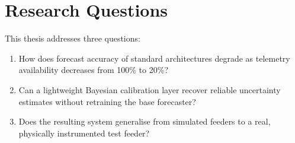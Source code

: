 \section{Research Questions}
This thesis addresses three questions:
\begin{enumerate}
  \item How does forecast accuracy of standard architectures degrade as telemetry
        availability decreases from 100\% to 20\%?
  \item Can a lightweight Bayesian calibration layer recover reliable uncertainty estimates
        without retraining the base forecaster?
  \item Does the resulting system generalise from simulated feeders to a real, physically
        instrumented test feeder?
\end{enumerate}
